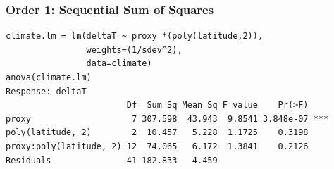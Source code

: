 \documentclass[]{beamer}
\begin{document}
\begin{frame}[fragile]
  \frametitle{Order 1: Sequential Sum of Squares }
  \begin{small}
\begin{verbatim}
climate.lm = lm(deltaT ~ proxy *(poly(latitude,2)),
                weights=(1/sdev^2), 
                data=climate)
anova(climate.lm)
Response: deltaT
                        Df  Sum Sq Mean Sq F value    Pr(>F)    
proxy                    7 307.598  43.943  9.8541 3.848e-07 ***
poly(latitude, 2)        2  10.457   5.228  1.1725    0.3198    
proxy:poly(latitude, 2) 12  74.065   6.172  1.3841    0.2126    
Residuals               41 182.833   4.459  
\end{verbatim}
    
\end{small}

\end{frame}
\end{document}
